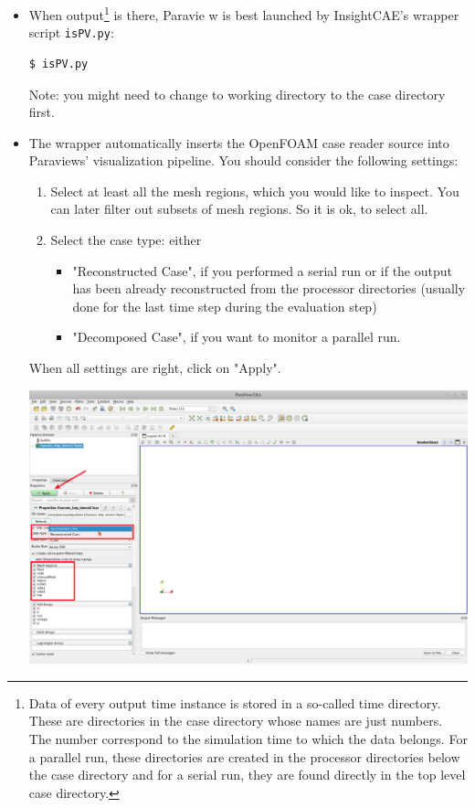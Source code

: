 \begin{itemize}
\item 
When output\footnote{Data of every output time instance is stored in a so-called time directory. These are directories in the case directory whose names are just numbers. The number correspond to the simulation time to which the data belongs. For a parallel run, these directories are created in the processor directories below the case directory and for a serial run, they are found directly in the top level case directory.} is there, Paravie w is best launched by InsightCAE's wrapper script \verb!isPV.py!:

\begin{lstlisting}
$ isPV.py
\end{lstlisting}

Note: you might need to change to working directory to the case directory first.

\item
The wrapper automatically inserts the OpenFOAM case reader source into Paraviews' visualization pipeline.
You should consider the following settings:
\begin{enumerate}
\item Select at least all the mesh regions, which you would like to inspect. You can later filter out subsets of mesh regions. So it is ok, to select all.
\item Select the case type: either 
\begin{itemize}
\item "Reconstructed Case", if you performed a serial run or if the output has been already reconstructed from the processor directories (usually done for the last time step during the evaluation step)
\item "Decomposed Case", if you want to monitor a parallel run.
\end{itemize}
\end{enumerate}

When all settings are right, click on "Apply".

\includegraphics[width=0.75\linewidth]{figs/paraview_of/paraview_load_case}


\end{itemize}
